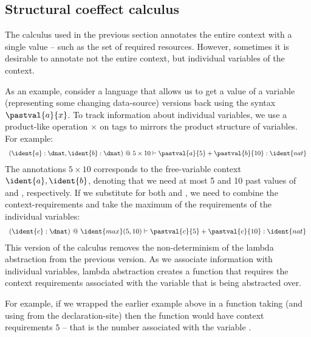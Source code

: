 
\subsection{Structural coeffect calculus}

The calculus used in the previous section annotates the entire context with a single value --  such
as the set of required resources. However, sometimes it is desirable to annotate not the entire 
context, but individual variables of the context.

As an example, consider a language that allows us to get a value of a variable (representing
some changing data-source)  versions back using the syntax $\pastval{a}{x}$. 
To track information about individual variables, we use a product-like operation $\times$ on tags 
to mirrors the product structure of variables. For example:
%
\begin{equation*}
\begin{array}{l}
(\ident{a}:\dnat, \ident{b}:\dnat) ~@~ 5 \times 10
  \vdash
    \pastval{a}{5}+\pastval{b}{10}: \ident{nat}
\end{array}
\end{equation*}
%
The annotations $5 \times 10$ corresponds to the free-variable context $\ident{a}, \ident{b}$, denoting
that we need at most 5 and 10 past values of  and , respectively. If we substitute 
 for both  and , we need to combine the context-requirements and take the
maximum of the requirements of the individual variables:
%
\begin{equation*}
\begin{array}{l}
(\ident{c}:\dnat) ~@~ \ident{max}(5, 10)
  \vdash
    \pastval{c}{5}+\pastval{c}{10}: \ident{nat}
\end{array}
\end{equation*}
%
This version of the calculus removes the non-determinism of the lambda abstraction from the previous
version. As we associate information with individual variables, lambda abstraction creates a function
that requires the context requirements associated with the variable that is being abstracted over.

For example, if we wrapped the earlier example above in a function taking  (and using 
 from the declaration-site) then the function would have context requirements $5$ -- that
is the number associated with the variable .

